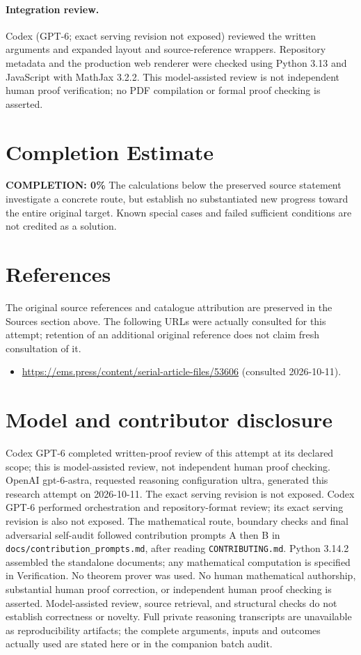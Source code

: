 \documentclass[11pt]{article}
\begin{document}
\paragraph{Integration review.} Codex (GPT-6; exact serving revision not exposed) reviewed the written arguments and expanded layout and source-reference wrappers. Repository metadata and the production web renderer were checked using Python 3.13 and JavaScript with MathJax 3.2.2. This model-assisted review is not independent human proof verification; no PDF compilation or formal proof checking is asserted.

\section{Completion Estimate}
\noindent\textbf{COMPLETION: 0\%}
The calculations below the preserved source statement investigate a concrete route,
but establish no substantiated new progress toward the entire original target.
Known special cases and failed sufficient conditions are not credited as a solution.
\section{References}
The original source references and catalogue attribution are preserved in the
Sources section above. The following URLs were actually consulted for this attempt;
retention of an additional original reference does not claim fresh consultation of it.
\begin{itemize}
\item \url{https://ems.press/content/serial-article-files/53606} (consulted 2026-10-11). 
\end{itemize}
\section{Model and contributor disclosure}
Codex GPT-6 completed written-proof review of this attempt at its declared scope; this is model-assisted review, not independent human proof checking.
OpenAI gpt-6-astra, requested reasoning configuration ultra, generated this research
attempt on 2026-10-11. The exact serving revision is not exposed. Codex GPT-6
performed orchestration and repository-format review; its exact serving revision
is also not exposed. The mathematical route, boundary checks and final adversarial
self-audit followed contribution prompts A then B in
\texttt{docs/contribution\_prompts.md}, after reading \texttt{CONTRIBUTING.md}.
Python 3.14.2 assembled the standalone documents; any mathematical computation is
specified in Verification. No theorem prover was used. No human mathematical
authorship, substantial human proof correction, or independent human proof checking
is asserted. Model-assisted review, source retrieval, and structural checks do not
establish correctness or novelty. Full private reasoning transcripts are unavailable
as reproducibility artifacts; the complete arguments, inputs and outcomes actually
used are stated here or in the companion batch audit.
\end{document}
